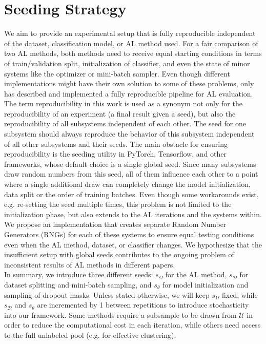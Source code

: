 \documentclass[]{article}
\begin{document}
\section{Seeding Strategy}\label{app:seeding_strategy}
We aim to provide an experimental setup that is fully reproducible independent of the dataset, classification model, or AL method used.
For a fair comparison of two AL methods, both methods need to receive equal starting conditions in terms of train/validation split, initialization of classifier, and even the state of minor systems like the optimizer or mini-batch sampler.
Even though different implementations might have their own solution to some of these problems, only \cite{ji2023randomness} has described and implemented a fully reproducible pipeline for AL evaluation.
The term reproducibility in this work is used as a synonym not only for the reproducibility of an experiment (a final result given a seed), but also the reproducibility of all subsystems independent of each other.
The seed for one subsystem should always reproduce the behavior of this subsystem independent of all other subsystems and their seeds.
The main obstacle for ensuring reproducibility is the seeding utility in PyTorch, Tensorflow, and other frameworks, whose default choice is a single global seed.
Since many subsystems draw random numbers from this seed, all of them influence each other to a point where a single additional draw can completely change the model initialization, data split or the order of training batches.
Even though some workarounds exist, e.g. re-setting the seed multiple times, this problem is not limited to the initialization phase, but also extends to the AL iterations and the systems within.
We propose an implementation that creates separate Random Number Generators (RNGs) for each of these systems to ensure equal testing conditions even when the AL method, dataset, or classifier changes.
We hypothesize that the insufficient setup with global seeds contributes to the ongoing problem of inconsistent results of AL methods in different papers. \\ [1mm]
In summary, we introduce three different seeds: $s_\Omega$ for the AL method, $s_\mathcal{D}$ for dataset splitting and mini-batch sampling, and $s_\theta$ for model initialization and sampling of dropout masks.
Unless stated otherwise, we will keep $s_\Omega$ fixed, while $s_\mathcal{D}$ and $s_\theta$ are incremented by 1 between repetitions to introduce stochasticity into our framework.
Some methods require a subsample to be drawn from $\mathcal{U}$ in order to reduce the computational cost in each iteration, while others need access to the full unlabeled pool (e.g. for effective clustering).
\end{document}
